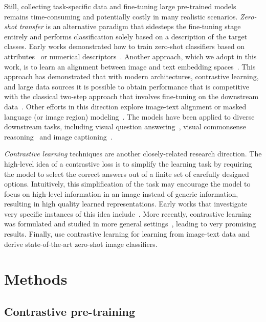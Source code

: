 \documentclass[10pt,twocolumn,letterpaper]{article}
\begin{document}
Still, collecting task-specific data and fine-tuning large pre-trained models remains time-consuming and potentially costly in many realistic scenarios. 
\textit{Zero-shot transfer} is an alternative paradigm that sidesteps the fine-tuning stage entirely and performs classification solely based on a description of the target classes. 
Early works demonstrated how to train zero-shot classifiers based on attributes~\cite{visual_attribute} or numerical descriptors~\cite{zero_data_learning}.
Another approach, which we adopt in this work, is to learn an alignment between image and text embedding spaces~\cite{devise,vse,karpathy,vse-pooling,virtex,convirt}. 
This approach has demonstrated that with modern architectures, contrastive learning, and large data sources it is possible to obtain performance that is competitive with the classical two-step approach that involves fine-tuning on the downstream data~\cite{clip,align}. 
Other efforts in this direction explore image-text alignment or masked language (or image region) modeling~\cite{VisualBERT,uniter}. 
The models have been applied to diverse downstream tasks, including visual question answering~\cite{vqa2}, visual commonsense reasoning~\cite{vcr} and image captioning~\cite{ViLBERT,VL-BERT,12-in-1}. 

\textit{Contrastive learning} techniques are another closely-related research direction.
The high-level idea of a contrastive loss is to simplify the learning task by requiring the model to select the correct answers out of a finite set of carefully designed options.
Intuitively, this simplification of the task may encourage the model to focus on high-level information in an image instead of generic information, resulting in high quality learned representations.
Early works that investigate very specific instances of this idea include~\cite{rel-patch-location,jigsaw}. More recently, contrastive learning was formulated and studied in more general settings~\cite{cpc,simclr,moco}, leading to very promising results. Finally, \cite{clip,align} use contrastive learning for learning from image-text data and derive state-of-the-art zero-shot image classifiers.



\section{Methods}\label{sec:methods}



\subsection{Contrastive pre-training}\label{sec:contrastive_pre_train}
\end{document}
